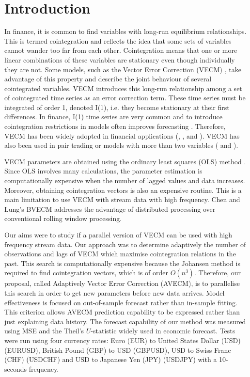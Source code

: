 \section{Introduction}
\label{sec:introduction}
In finance, it is common to find variables with long-run equilibrium
relationships. This is termed cointegration and reflects the idea that some sets
of variables cannot wander too far from each other. Cointegration means that one
or more linear combinations of these variables are stationary even though
individually they are not. Some models, such as the Vector Error Correction
(VECM) \citep{engle87}, take advantage of this property and describe the joint
behaviour of several cointegrated variables. VECM introduces this long-run
relationship among a set of cointegrated time series as an error correction
term. These time series must be integrated of order 1, denoted I(1), i.e. they
become stationary at their first differences. In finance, I(1) time series are
very common and to introduce cointegration restrictions in models often improves
forecasting \citep{duy1998}. Therefore, VECM has been widely adopted in financial
applications (\cite{mukherjee1995}, \cite{seong2013}, \cite{maysami2000} and
\cite{arestis2001}). VECM has also been used in pair trading \citep{herlemont2003} or
models with more than two variables (\cite{mukherjee1995} and \cite{engle2004}).

VECM parameters are obtained using the ordinary least squares (OLS) method
\citep{golub1980}. Since OLS involves many calculations, the parameter estimation
is computationally expensive when the number of lagged values and data
increases. Moreover, obtaining cointegration vectors is also an expensive
routine. This is a main limitation to use VECM with stream data with high
frequency.  Chen and Lung's BVECM \citep{chen2003} addresses the advantage of
distributed processing over conventional rolling window processing. 

Our aims were to study if a parallel version of VECM can be used with high
frequency stream data.  Our approach was to determine adaptively the number of
observations and lags of VECM which maximise cointegration relations in the
past.  This search is computationally expensive because the Johansen method
\citep{johansen1995} is required to find cointegration vectors, which is of order
$O(n^3)$. Therefore, our proposal, called Adaptively Vector Error Correction
(AVECM), is to parallelise this search in order to get new parameters before new
data arrives.  Model effectiveness is focused on out-of-sample forecast rather
than in-sample fitting. This criterion allows AVECM prediction capability to be
expressed rather than just explaining data history.  The forecast capability of
our method was measured using MSE and the Theil's $U$-statistic \citep{theil1966}
widely used in economic forecast. Tests were run using four currency rates: Euro
(EUR) to United States Dollar (USD) (EURUSD), British Pound (GBP) to USD
(GBPUSD), USD to Swiss Franc (CHF) (USDCHF) and USD to Japanese Yen (JPY)
(USDJPY) with a 10-seconds frequency.

